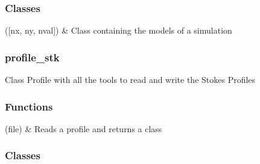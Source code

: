 \documentclass[letterpaper,10pt,english]{sphinxmanual}
\begin{document}
\subsubsection*{Classes}


\begin{savenotes}\sphinxattablestart
\sphinxthistablewithglobalstyle
\sphinxthistablewithnovlinesstyle
\centering
\begin{tabulary}{\linewidth}[t]{}
\sphinxtoprule
\sphinxtableatstartofbodyhook
\sphinxAtStartPar
{\hyperref[\detokenize{classes:model.Model}]{}}({[}nx, ny, nval{]})
&
\sphinxAtStartPar
Class containing the models of a simulation
\\
\sphinxbottomrule
\end{tabulary}
\sphinxtableafterendhook\par
\sphinxattableend\end{savenotes}

\sphinxstepscope


\subsubsection{profile\_stk}
\label{\detokenize{generated/profile_stk:module-profile_stk}}\label{\detokenize{generated/profile_stk:profile-stk}}\label{\detokenize{generated/profile_stk::doc}}
\sphinxAtStartPar
Class Profile with all the tools to read and write the Stokes Profiles
\subsubsection*{Functions}


\begin{savenotes}\sphinxattablestart
\sphinxthistablewithglobalstyle
\sphinxthistablewithnovlinesstyle
\centering
\begin{tabulary}{\linewidth}[t]{}
\sphinxtoprule
\sphinxtableatstartofbodyhook
\sphinxAtStartPar
{}(file)
&
\sphinxAtStartPar
Reads a profile and returns a class
\\
\sphinxbottomrule
\end{tabulary}
\sphinxtableafterendhook\par
\sphinxattableend\end{savenotes}
\subsubsection*{Classes}
\end{document}
